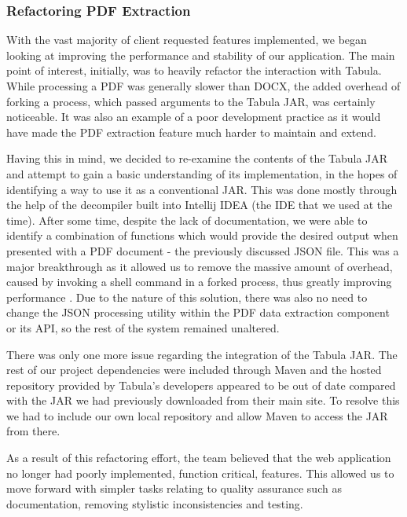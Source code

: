 \documentclass{l3proj}
\begin{document}
\subsubsection{Refactoring PDF Extraction}
\label{sec:refactor_pdf}
With the vast majority of client requested features implemented, we began looking at improving the performance and stability of our application. The main point of interest, initially, was to heavily refactor the interaction with Tabula. While processing a PDF was generally slower than DOCX, the added overhead of forking a process, which passed arguments to the Tabula JAR, was certainly noticeable. It was also an example of a poor development practice as it would have made the PDF extraction feature much harder to maintain and extend.

Having this in mind, we decided to re-examine the contents of the Tabula JAR and attempt to gain a basic understanding of its implementation, in the hopes of identifying a way to use it as a conventional JAR. This was done mostly through the help of the decompiler built into Intellij IDEA (the IDE that we used at the time). After some time, despite the lack of documentation, we were able to identify a combination of functions which would provide the desired output when presented with a PDF document - the previously discussed JSON file. This was a major breakthrough as it allowed us to remove the massive amount of overhead, caused by invoking a shell command in a forked process, thus greatly improving performance \cite{Refactoring}. Due to the nature of this solution, there was also no need to change the JSON processing utility within the PDF data extraction component or its API, so the rest of the system remained unaltered.

There was only one more issue regarding the integration of the Tabula JAR. The rest of our project dependencies were included through Maven and the hosted repository provided by Tabula's developers appeared to be out of date compared with the JAR we had previously downloaded from their main site. To resolve this we had to include our own local repository and allow Maven to access the JAR from there.

As a result of this refactoring effort, the team believed that the web application no longer had poorly implemented, function critical, features. This allowed us to move forward with simpler tasks relating to quality assurance such as documentation, removing stylistic inconsistencies and testing.
\end{document}
